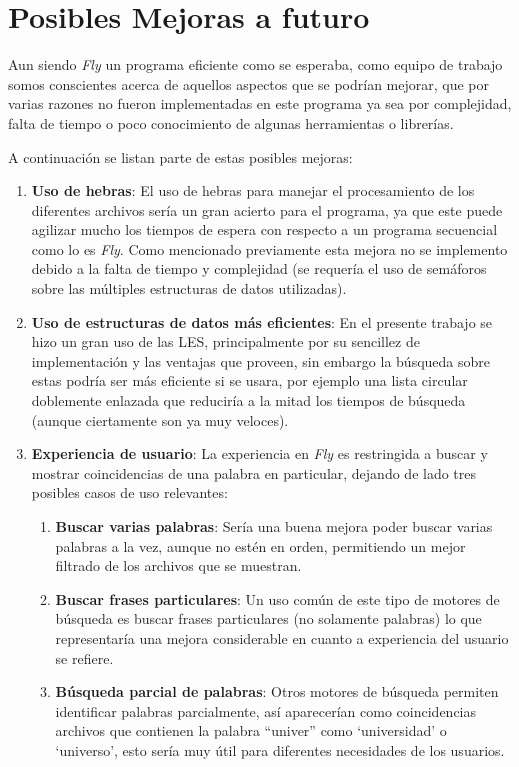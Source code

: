 \section{Posibles Mejoras a futuro}
Aun siendo \textit{Fly} un programa eficiente como se esperaba, como equipo de trabajo somos conscientes acerca de aquellos aspectos que se podrían mejorar, que por varias razones no fueron implementadas en este programa ya sea por complejidad, falta de tiempo o poco conocimiento de algunas herramientas o librerías.

A continuación se listan parte de estas posibles mejoras:
\begin{enumerate}
    \item \textbf{Uso de hebras}: El uso de hebras para manejar el procesamiento de los diferentes archivos sería un gran acierto para el programa, ya que este puede agilizar mucho los tiempos de espera con respecto a un programa secuencial como lo es \textit{Fly}. Como mencionado previamente esta mejora no se implemento debido a la falta de tiempo y complejidad (se requería el uso de semáforos sobre las múltiples estructuras de datos utilizadas).

    \item \textbf{Uso de estructuras de datos más eficientes}: En el presente trabajo se hizo un gran uso de las LES, principalmente por su sencillez de implementación y las ventajas que proveen, sin embargo la búsqueda sobre estas podría ser más eficiente si se usara, por ejemplo una lista circular doblemente enlazada que reduciría a la mitad los tiempos de búsqueda (aunque ciertamente son ya muy veloces).

    \item \textbf{Experiencia de usuario}: La experiencia en \textit{Fly} es restringida a buscar y mostrar coincidencias de una palabra en particular, dejando de lado tres posibles casos de uso relevantes:
    \begin{enumerate}
        \item \textbf{Buscar varias palabras}: Sería una buena mejora poder buscar varias palabras a la vez, aunque no estén en orden, permitiendo un mejor filtrado de los archivos que se muestran.
        \item \textbf{Buscar frases particulares}: Un uso común de este tipo de motores de búsqueda es buscar frases particulares (no solamente palabras) lo que representaría una mejora considerable en cuanto a experiencia del usuario se refiere.
        \item \textbf{Búsqueda parcial de palabras}: Otros motores de búsqueda permiten identificar palabras parcialmente, así aparecerían como coincidencias archivos que contienen la palabra ``univer'' como `universidad' o `universo', esto sería muy útil para diferentes necesidades de los usuarios.
    \end{enumerate}
\end{enumerate}